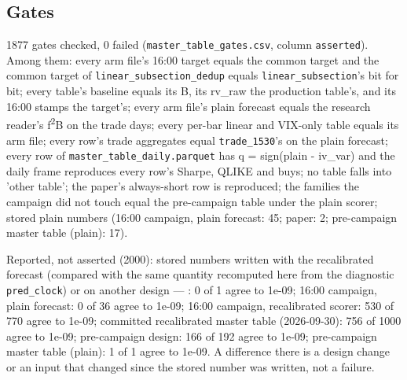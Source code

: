 \documentclass[10pt]{article}
\begin{document}
\subsection*{Gates}
1877 gates checked, 0 failed (\texttt{master\_table\_gates.csv}, column \texttt{asserted}). Among them: every arm file's 16:00 target equals the common target and the common target of \texttt{linear\_subsection\_dedup} equals \texttt{linear\_subsection}'s bit for bit; every table's baseline equals its B, its rv\_raw the production table's, and its 16:00 stamps the target's; every arm file's plain forecast equals the research reader's f\textsuperscript{2}\textperiodcentered{}B on the trade days; every per-bar linear and VIX-only table equals its arm file; every row's trade aggregates equal \texttt{trade\_1530}'s on the plain forecast; every row of \texttt{master\_table\_daily.parquet} has q = sign(plain - iv\_var) and the daily frame reproduces every row's Sharpe, QLIKE and buys; no table falls into 'other table'; the paper's always-short row is reproduced; the families the campaign did not touch equal the pre-campaign table under the plain scorer; stored plain numbers (16:00 campaign, plain forecast: 45; paper: 2; pre-campaign master table (plain): 17).\par
Reported, not asserted (2000): stored numbers written with the recalibrated forecast (compared with the same quantity recomputed here from the diagnostic \texttt{pred\_clock}) or on another design --- : 0 of 1 agree to 1e-09; 16:00 campaign, plain forecast: 0 of 36 agree to 1e-09; 16:00 campaign, recalibrated scorer: 530 of 770 agree to 1e-09; committed recalibrated master table (2026-09-30): 756 of 1000 agree to 1e-09; pre-campaign design: 166 of 192 agree to 1e-09; pre-campaign master table (plain): 1 of 1 agree to 1e-09. A difference there is a design change or an input that changed since the stored number was written, not a failure.\par
\end{document}
